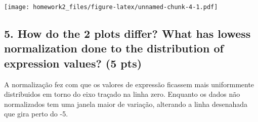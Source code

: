 \documentclass[]{article}
\begin{document}
\texttt{[image: homework2\_files/figure-latex/unnamed-chunk-4-1.pdf]}

\subsection{5. How do the 2 plots differ? What has lowess normalization
done to the distribution of expression values? (5
pts)}\label{how-do-the-2-plots-differ-what-has-lowess-normalization-done-to-the-distribution-of-expression-values-5-pts}

A normalização fez com que os valores de expressão ficassem mais
uniformmente distribuidos em torno do eixo traçado na linha zero.
Enquanto os dados não normalizados tem uma janela maior de variação,
alterando a linha desenahada que gira perto do -5.
\end{document}

